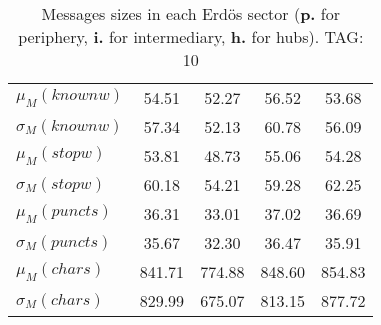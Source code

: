 \begin{table}[h!]
\begin{center}
\begin{tabular}{| l || c | c | c | c |}
$\mu_M(knownw)$ & 54.51  & 52.27  & 56.52  & 53.68 \\
$\sigma_M(knownw)$ & 57.34  & 52.13  & 60.78  & 56.09 \\\hline
$\mu_M(stopw)$ & 53.81  & 48.73  & 55.06  & 54.28 \\
$\sigma_M(stopw)$ & 60.18  & 54.21  & 59.28  & 62.25 \\\hline
$\mu_M(puncts)$ & 36.31  & 33.01  & 37.02  & 36.69 \\
$\sigma_M(puncts)$ & 35.67  & 32.30  & 36.47  & 35.91 \\\hline
$\mu_M(chars)$ & 841.71  & 774.88  & 848.60  & 854.83 \\
$\sigma_M(chars)$ & 829.99  & 675.07  & 813.15  & 877.72 \\\hline
\end{tabular}
\caption{Messages sizes in each Erd\"os sector ({{\bf p.}} for periphery, {{\bf i.}} for intermediary, {{\bf h.}} for hubs). TAG: 10}
\end{center}
\end{table}